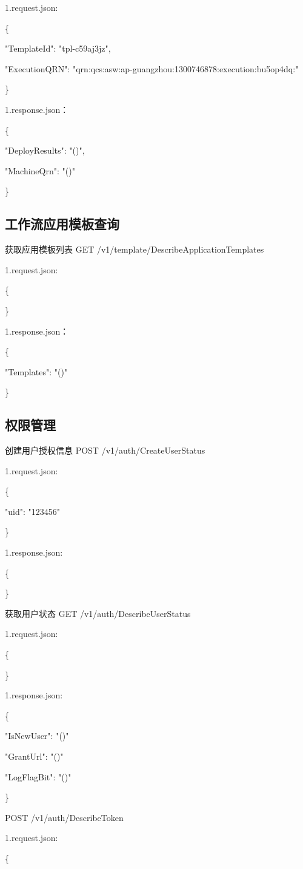 1.request.json:

\{

"TemplateId": "tpl-c59aj3jz",

"ExecutionQRN": "qrn:qcs:asw:ap-guangzhou:1300746878:execution:bu5op4dq:"

\}

1.response.json：

\{

"DeployResults": "\@exists()",

"MachineQrn": "\@len()"

\}

\subsection{工作流应用模板查询}
获取应用模板列表
GET /v1/template/DescribeApplicationTemplates

1.request.json:

\{

\}

1.response.json：

\{

"Templates": "\@exists()"

\}

\subsection{权限管理}
创建用户授权信息
POST /v1/auth/CreateUserStatus

1.request.json:

\{

"uid": "123456"

\}

1.response.json:

\{

\}

获取用户状态
GET /v1/auth/DescribeUserStatus

1.request.json:

\{

\}

1.response.json:

\{

"IsNewUser": "\@exists()"

"GrantUrl": "\@exists()"

"LogFlagBit": "\@exists()"

\}

POST /v1/auth/DescribeToken

1.request.json:

\{

